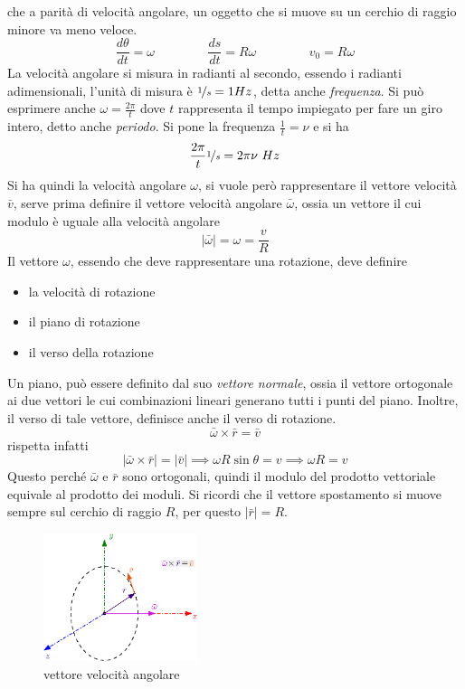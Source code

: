\documentclass[10pt, letterpaper]{report}
\begin{document}
che a parità di velocità angolare, un oggetto che si muove su un cerchio di raggio minore va meno veloce. 
$$ \frac{d\theta}{dt}=\omega \;\;\;\;\;\;\;\;\;\;\;\;\;\;\;
\frac{ds}{dt}=R\omega \;\;\;\;\; \;\;\;\;\;\;\;\;\;\;
v_0=R\omega$$
La velocità angolare si misura in radianti al secondo, essendo i radianti adimensionali, l'unità 
di misura è $\nicefrac{1}{s}=1 Hz$, detta anche \textit{frequenza}. Si può esprimere 
anche $\omega=\frac{2\pi}{t}$ dove $t$ rappresenta il tempo impiegato per fare un giro intero, 
detto anche \textit{periodo}. Si pone  la frequenza $\frac{1}{t}=\nu$ e si ha 
$$\frac{2\pi}{t} \nicefrac{1}{s}=2\pi\nu\ Hz$$
Si ha quindi la velocità angolare $\omega$, si vuole però rappresentare il vettore 
velocità $\bar v$, serve prima definire il vettore velocità angolare $\bar \omega$, ossia un vettore il cui modulo è 
uguale alla velocità angolare 
$$ |\bar \omega|=\omega = \frac{v}{R}$$
Il vettore $\omega$, essendo che deve rappresentare una rotazione, deve definire \begin{itemize}
    \item la velocità di rotazione 
    \item il piano di rotazione 
    \item il verso della rotazione 
\end{itemize}
Un piano, può essere definito dal suo \textit{vettore normale}, ossia il vettore ortogonale ai due 
vettori le cui combinazioni lineari generano tutti i punti del piano. Inoltre, il verso di tale vettore, 
definisce anche il verso di rotazione. 
$$\bar \omega \times \bar r = \bar v$$
rispetta infatti 
$$|\bar \omega \times \bar r| = |\bar v|\implies \omega R\sin\theta = v\implies \omega R = v$$
Questo perché $\bar \omega $ e $\bar r$ sono ortogonali, quindi il modulo del prodotto vettoriale equivale al prodotto dei moduli.
Si ricordi che il vettore spostamento si muove sempre sul cerchio di raggio $R$, per questo 
$|\bar r| = R$.
\begin{center}
    \begin{figure}[h!]
        \centering
        \includegraphics[width=0.4\textwidth]{images/vetVelocitaAngolare.eps}
        \caption{vettore velocità angolare}
    \end{figure} 
\end{center}
\end{document}
